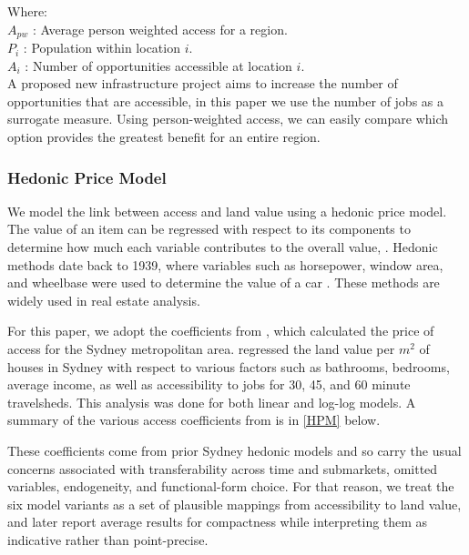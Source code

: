 \documentclass[preprint,12pt,authoryear]{elsarticle}
\begin{document}
Where:\\
\(A_{pw}\) : Average person weighted access for a region. \\
\(P_{i}\) : Population within location \(i\). \\
\(A_{i}\) : Number of opportunities accessible at location \(i\). \\

A proposed new infrastructure project aims to increase the number of opportunities that are accessible, in this paper we use the number of jobs as a surrogate measure. Using person-weighted access, we can easily compare which option provides the greatest benefit for an entire region. 

\subsubsection{Hedonic Price Model}\label{sec:Hedonic Price Model}   


We model the link between access and land value using a hedonic price model.  The value of an item can be regressed with respect to its components to determine how much each variable contributes to the overall value,  \parencite{GOODMAN1998}. Hedonic methods date back to 1939, where variables such as horsepower, window area, and wheelbase were used to determine the value of a car \parencite{Court1939}. These methods are widely used in real estate analysis. 

For this paper, we adopt the coefficients from \textcite{MANN2024}, which calculated the price of access for the Sydney metropolitan area. \textcite{MANN2024} regressed the land value per \(m^2\) of houses in Sydney with respect to various factors such as bathrooms, bedrooms, average income, as well as accessibility to jobs for 30, 45, and 60 minute travelsheds. This analysis was done for both linear and log-log models. A summary of the various access coefficients from \textcite{MANN2024} is in \ref{HPM} below. 

{These coefficients come from prior Sydney hedonic models and so carry the usual concerns associated with transferability across time and submarkets, omitted variables, endogeneity, and functional-form choice. For that reason, we treat the six model variants as a set of plausible mappings from accessibility to land value, and later report average results for compactness while interpreting them as indicative rather than point-precise.}
\end{document}
